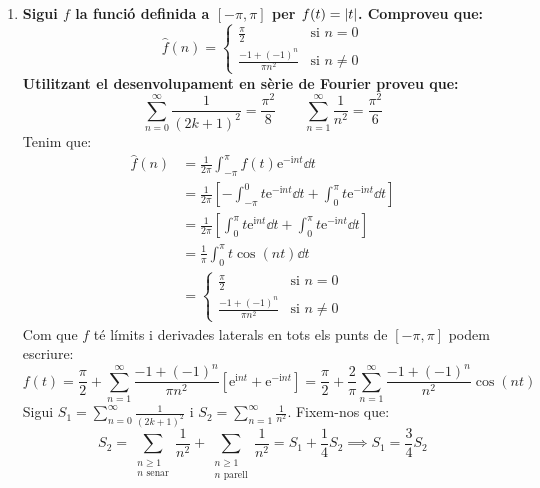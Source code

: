 \documentclass[10pt,a4paper]{article}
\newcommand{\ii}{\mathrm{i}} %
\theoremstyle{definition}
\renewcommand{\exp}[1]{\mathrm{e}^{#1}} %
\begin{document}
\begin{enumerate}
  \item \textbf{Sigui $f$ la funció definida a $[-\pi,\pi]$ per $f(t)=\abs{t}$. Comproveu que:} $$\widehat{f}(n)=\begin{cases}
            \frac{\pi}{2}               & \text{si }n=0    \\
            \frac{-1+{(-1)}^n}{\pi n^2} & \text{si }n\ne 0
          \end{cases}$$
        \textbf{Utilitzant el desenvolupament en sèrie de Fourier proveu que:}
        $$\sum_{n=0}^\infty\frac{1}{{(2k+1)}^2}=\frac{\pi^2}{8}\qquad\sum_{n=1}^\infty\frac{1}{n^2}=\frac{\pi^2}{6}$$
        Tenim que:
        \begin{align*}
          \widehat{f}(n) & =\frac{1}{2\pi}\int_{-\pi}^{\pi}f(t)\exp{-\ii n t}\dd{t}                                              \\
                         & =\frac{1}{2\pi}\left[-\int_{-\pi}^{0}t\exp{-\ii n t}\dd{t}+\int_{0}^{\pi}t\exp{-\ii n t}\dd{t}\right] \\
                         & =\frac{1}{2\pi}\left[\int_{0}^{\pi}t\exp{\ii n t}\dd{t}+\int_{0}^{\pi}t\exp{-\ii n t}\dd{t}\right]    \\
                         & =\frac{1}{\pi}\int_0^\pi t\cos(n t)\dd{t}                                                             \\
                         & =\begin{cases}
                              \frac{\pi}{2}               & \text{si }n=0    \\
                              \frac{-1+{(-1)}^n}{\pi n^2} & \text{si }n\ne 0
                            \end{cases}
        \end{align*}
        Com que $f$ té límits i derivades laterals en tots els punts de $[-\pi,\pi]$ podem escriure: $$f(t)=\frac{\pi}{2}+\sum_{n=1}^\infty\frac{-1+{(-1)}^n}{\pi n^2}\left[\exp{\ii n t}+\exp{-\ii n t}\right]=\frac{\pi}{2}+\frac{2}{\pi}\sum_{n=1}^\infty\frac{-1+{(-1)}^n}{n^2}\cos(n t)$$
        Sigui $S_1=\sum_{n=0}^\infty\frac{1}{{(2k+1)}^2}$ i $S_2=\sum_{n=1}^\infty\frac{1}{n^2}$. Fixem-nos que:
        \begin{equation}\label{ex2}
          S_2=\sum_{\substack{n\geq 1\\n\text{ senar}}}\frac{1}{n^2}+\sum_{\substack{n\geq 1\\n\text{ parell}}}\frac{1}{n^2}=S_1+\frac{1}{4}S_2\implies S_1=\frac{3}{4}S_2
        \end{equation}

\end{enumerate}
\end{document}
